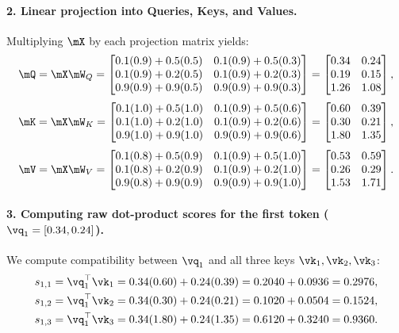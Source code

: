 \documentclass[../../main.tex]{subfiles}
\begin{document}
\begin{examinsight}
\paragraph{2. Linear projection into Queries, Keys, and Values.}
Multiplying $\mX$ by each projection matrix yields:
\begin{equation}
\mQ = \mX \mW_Q = \begin{bmatrix}
0.1(0.9) + 0.5(0.5) & 0.1(0.9) + 0.5(0.3) \\
0.1(0.9) + 0.2(0.5) & 0.1(0.9) + 0.2(0.3) \\
0.9(0.9) + 0.9(0.5) & 0.9(0.9) + 0.9(0.3)
\end{bmatrix} = \begin{bmatrix}
0.34 & 0.24 \\
0.19 & 0.15 \\
1.26 & 1.08
\end{bmatrix},
\end{equation}
\begin{equation}
\mK = \mX \mW_K = \begin{bmatrix}
0.1(1.0) + 0.5(1.0) & 0.1(0.9) + 0.5(0.6) \\
0.1(1.0) + 0.2(1.0) & 0.1(0.9) + 0.2(0.6) \\
0.9(1.0) + 0.9(1.0) & 0.9(0.9) + 0.9(0.6)
\end{bmatrix} = \begin{bmatrix}
0.60 & 0.39 \\
0.30 & 0.21 \\
1.80 & 1.35
\end{bmatrix},
\end{equation}
\begin{equation}
\mV = \mX \mW_V = \begin{bmatrix}
0.1(0.8) + 0.5(0.9) & 0.1(0.9) + 0.5(1.0) \\
0.1(0.8) + 0.2(0.9) & 0.1(0.9) + 0.2(1.0) \\
0.9(0.8) + 0.9(0.9) & 0.9(0.9) + 0.9(1.0)
\end{bmatrix} = \begin{bmatrix}
0.53 & 0.59 \\
0.26 & 0.29 \\
1.53 & 1.71
\end{bmatrix}.
\end{equation}

\paragraph{3. Computing raw dot-product scores for the first token ($\vq_1 = [0.34, 0.24]$).}
We compute compatibility between $\vq_1$ and all three keys $\vk_1, \vk_2, \vk_3$:
\begin{align}
s_{1,1} &= \vq_1^\top \vk_1 = 0.34(0.60) + 0.24(0.39) = 0.2040 + 0.0936 = 0.2976, \\
s_{1,2} &= \vq_1^\top \vk_2 = 0.34(0.30) + 0.24(0.21) = 0.1020 + 0.0504 = 0.1524, \\
s_{1,3} &= \vq_1^\top \vk_3 = 0.34(1.80) + 0.24(1.35) = 0.6120 + 0.3240 = 0.9360.
\end{align}


\end{examinsight}
\end{document}
